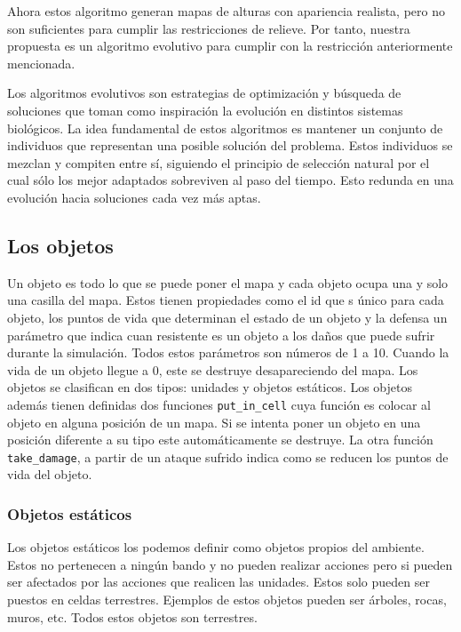 Ahora estos algoritmo generan mapas de alturas con apariencia realista, pero no son suficientes para cumplir las restricciones de relieve. Por tanto, nuestra propuesta es un algoritmo evolutivo para cumplir con la restricción anteriormente mencionada.

Los algoritmos evolutivos son estrategias de optimización y búsqueda de soluciones que toman como inspiración la evolución en distintos sistemas biológicos. La idea fundamental de estos algoritmos es mantener un conjunto de individuos que representan una posible solución del problema. Estos individuos se mezclan y compiten entre sí, siguiendo el principio de selección natural por el cual sólo los mejor adaptados sobreviven al paso del tiempo. Esto redunda en una evolución hacia soluciones cada vez más aptas. 

\subsection{Los objetos}

Un objeto es todo lo que se puede poner el mapa y cada objeto ocupa una y solo una casilla del mapa. Estos tienen propiedades como el id que s \'unico para cada objeto, los puntos de vida que determinan el estado de un objeto y la defensa un par\'ametro que indica cuan resistente es un objeto a los da\~{n}os que puede sufrir durante la simulaci\'on. Todos estos par\'ametros son n\'umeros de 1 a 10. Cuando la vida de un objeto llegue a 0, este se destruye desapareciendo del mapa. Los objetos se clasifican en dos tipos: unidades y objetos est\'aticos. Los objetos adem\'as tienen definidas dos funciones \verb|put_in_cell| cuya funci\'on es colocar al objeto en alguna posici\'on de un mapa. Si se intenta poner un objeto en una posici\'on diferente a su tipo este autom\'aticamente se destruye. La otra funci\'on \verb|take_damage|, a partir de un ataque sufrido indica como se reducen los puntos de vida del objeto.

\subsubsection{Objetos est\'aticos}

Los objetos est\'aticos los podemos definir como objetos propios del ambiente. Estos no pertenecen a ning\'un bando y no pueden realizar acciones pero si pueden ser afectados por las acciones que realicen las unidades. Estos solo pueden ser puestos en celdas terrestres. Ejemplos de estos objetos pueden ser \'arboles, rocas, muros, etc. Todos estos objetos son terrestres. 

